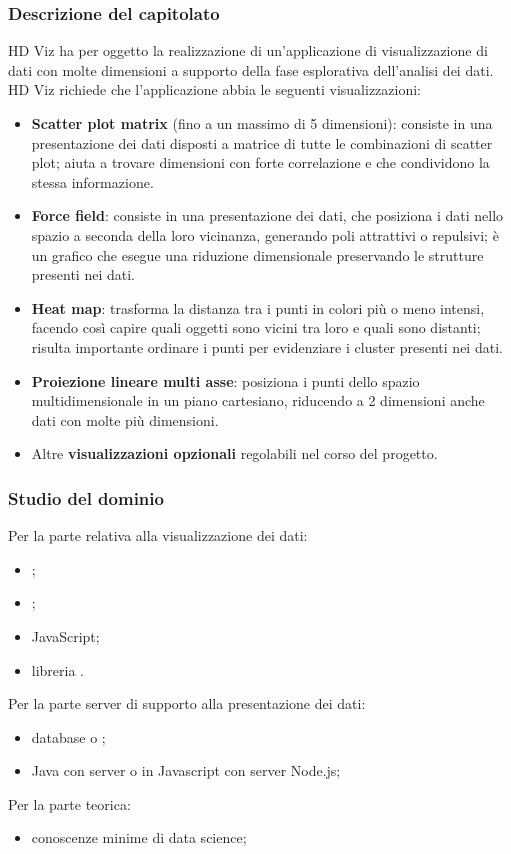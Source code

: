 \subsubsection{Descrizione del capitolato}
HD Viz ha per oggetto la realizzazione di un'applicazione di visualizzazione di dati con molte dimensioni a supporto della fase esplorativa dell'analisi dei dati. HD Viz richiede che l'applicazione abbia le seguenti visualizzazioni:
\begin{itemize}
	\item \textbf{Scatter plot matrix} (fino a un massimo di 5 dimensioni): consiste in una presentazione dei dati disposti a matrice di tutte le combinazioni di scatter plot; aiuta a trovare dimensioni con forte correlazione e che condividono la stessa informazione.
	\item \textbf{Force field}: consiste in una presentazione dei dati, che posiziona i dati nello spazio a seconda della loro vicinanza, generando poli attrattivi o repulsivi; è un grafico che esegue una riduzione dimensionale preservando le strutture presenti nei dati.
	\item \textbf{Heat map}: trasforma la distanza tra i punti in colori più o meno intensi, facendo così capire quali oggetti sono vicini tra loro e quali sono distanti; risulta importante ordinare i punti per evidenziare i cluster presenti nei dati.
	\item \textbf{Proiezione lineare multi asse}: posiziona i punti dello spazio multidimensionale in un piano cartesiano, riducendo a 2 dimensioni anche dati con molte più dimensioni.
	\item Altre \textbf{visualizzazioni opzionali} regolabili nel corso del progetto.
\end{itemize}
\subsubsection{Studio del dominio}
Per la parte relativa alla visualizzazione dei dati:
\begin{itemize}
	\item {};
	\item {};
	\item JavaScript;
	\item libreria .
\end{itemize}
Per la parte server di supporto alla presentazione dei dati:
\begin{itemize}
	\item database  o ;
	\item Java con server  o in Javascript con server Node.js;
\end{itemize}
Per la parte teorica:
\begin{itemize}
	\item conoscenze minime di data science;
\end{itemize}
